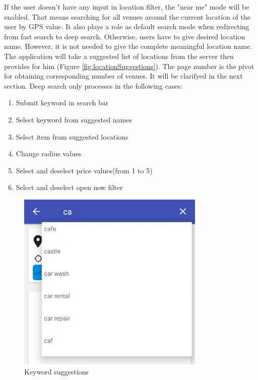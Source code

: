 If the user doesn't have any input in location filter, the "near me" mode will be enabled. That means searching for all venues around the current location of the user by GPS value. It also plays a role as default search mode when redirecting from fast search to deep search. Otherwise, users have to give desired location name. However, it is not needed to give the complete meaningful location name. The application will take a suggested list of locations from the server then provides for him (Figure \ref{fig:locationSuggestions}).
The page number is the pivot for obtaining corresponding number of venues. It will be clarifyed in the next section.
Deep search only processes in the following cases:
\begin{enumerate}
	\item Submit keyword in search bar
	\item Select keyword from suggested names
	\item Select item from suggested locations
	\item Change radius values
	\item Select and deselect price values(from 1 to 5)
	\item Select and deselect open now filter
\end{enumerate}


\begin{figure}[htbp]
	\includegraphics[width=0.8\textwidth]{images/suggestedkeywords.jpg}
	\centering
	\caption[]{Keyword suggestions}
	\label{fig:keywordSuggestions}
\end{figure} 

